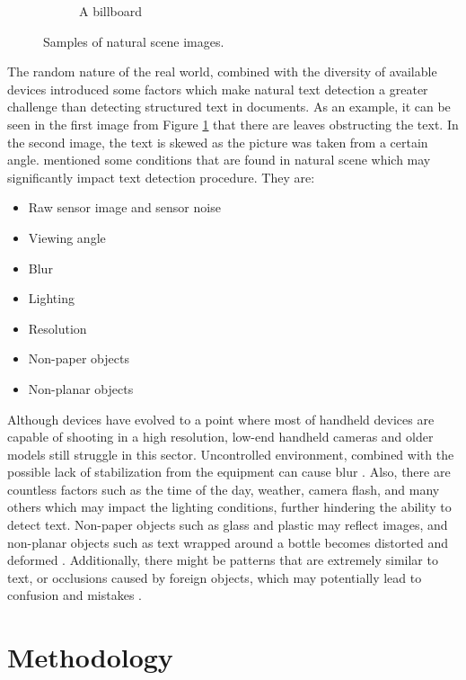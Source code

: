\documentclass[10pt, a4paper]{article}
\begin{document}
\begin{figure}[h!]
\begin{subfigure}[b]{0.4\linewidth}
		\caption{A billboard}
	  \end{subfigure}
	\caption{Samples of natural scene images.}
	\label{fig:samples}
  \end{figure}

The random nature of the real world, combined with the diversity of available devices introduced some factors which make natural text detection a greater challenge than detecting structured text in documents. 
As an example, it can be seen in the first image from Figure \ref{fig:samples} that there are leaves obstructing the text. In the second image, the text is skewed as the picture was taken from a certain angle.
\cite{NaturalScene} mentioned some conditions that are found in natural scene which may significantly impact text detection procedure. They are:
\begin{itemize}
	\item Raw sensor image and sensor noise
	\item Viewing angle
	\item Blur
	\item Lighting
	\item Resolution
	\item Non-paper objects
	\item Non-planar objects
\end{itemize}
Although devices have evolved to a point where most of handheld devices are capable of shooting in a high resolution, low-end handheld cameras and older models still struggle in this sector.
Uncontrolled environment, combined with the possible lack of stabilization from the equipment can cause blur \citep{Rosebrockeast}. Also, there are countless factors such as the time of the day, weather, camera flash, and many others which may impact the lighting conditions, further hindering the ability to detect text. Non-paper objects such as glass and plastic may reflect images, and non-planar objects such as text wrapped around a bottle becomes distorted and deformed \citep{Rosebrockeast}.
Additionally, there might be patterns that are extremely similar to text, or occlusions caused by foreign objects, which may potentially lead to confusion and mistakes \citep{LongEtAl}.

\clearpage

\section{Methodology} %
\label{sec:methodology}
\end{document}
